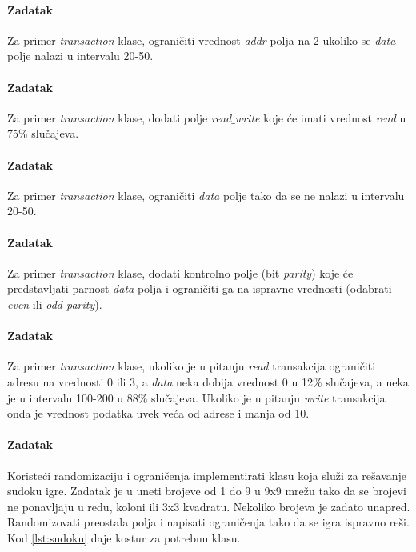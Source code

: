 \paragraph{Zadatak}

Za primer \emph{transaction} klase, ograničiti vrednost \emph{addr} polja na 2
ukoliko se \emph{data} polje nalazi u intervalu 20-50.

\paragraph{Zadatak}

Za primer \emph{transaction} klase, dodati polje \emph{read\(\_\)write} koje će
imati vrednost \emph{read} u 75\% slučajeva.

\paragraph{Zadatak}

Za primer \emph{transaction} klase, ograničiti \emph{data} polje tako da se ne
nalazi u intervalu 20-50.

\paragraph{Zadatak}

Za primer \emph{transaction} klase, dodati kontrolno polje (bit \emph{parity})
koje će predstavljati parnost \emph{data} polja i ograničiti ga na ispravne
vrednosti (odabrati \emph{even} ili \emph{odd parity}).

\paragraph{Zadatak}

Za primer \emph{transaction} klase, ukoliko je u pitanju \emph{read} transakcija
ograničiti adresu na vrednosti 0 ili 3, a \emph{data} neka dobija vrednost 0 u
12\% slučajeva, a neka je u intervalu 100-200 u 88\% slučajeva. Ukoliko je u
pitanju \emph{write} transakcija onda je vrednost podatka uvek veća od adrese i
manja od 10.

\paragraph{Zadatak}

Koristeći randomizaciju i ograničenja implementirati klasu koja služi za
rešavanje sudoku igre. Zadatak je u uneti brojeve od 1 do 9 u 9x9 mrežu tako da
se brojevi ne ponavljaju u redu, koloni ili 3x3 kvadratu. Nekoliko brojeva je
zadato unapred. Randomizovati preostala polja i napisati ograničenja tako da se
igra ispravno reši. Kod \ref{lst:sudoku} daje kostur za potrebnu klasu.




